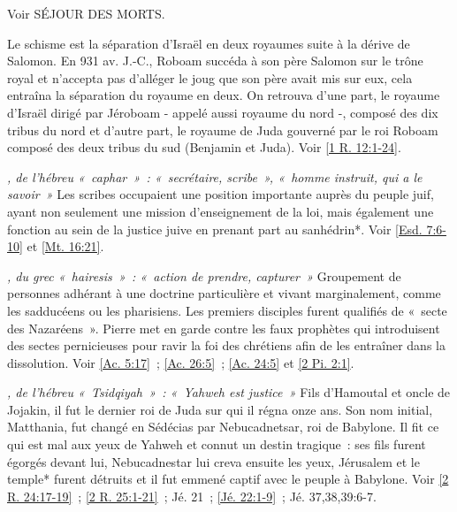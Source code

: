 \begin{multicols}{2}
\textit{}\newline
Voir SÉJOUR DES MORTS.

\textit{}\newline
Le schisme est la séparation d'Israël en deux royaumes suite à la dérive de Salomon. En 931 av. J.-C., Roboam succéda à son père Salomon sur le trône royal et n'accepta pas d'alléger le joug que son père avait mis sur eux, cela entraîna la séparation du royaume en deux. On retrouva d'une part, le royaume d'Israël dirigé par Jéroboam - appelé aussi royaume du nord -, composé des dix tribus du nord et d'autre part, le royaume de Juda gouverné par le roi Roboam composé des deux tribus du sud (Benjamin et Juda). Voir \vref{1 R. 12:1-24}.

\textit{, de l'hébreu «~caphar~»~: «~secrétaire, scribe~», «~homme instruit, qui a le savoir~»}\newline
Les scribes occupaient une position importante auprès du peuple juif, ayant non seulement une mission d'enseignement de la loi, mais également une fonction au sein de la justice juive en prenant part au sanhédrin*. Voir \vref{Esd. 7:6-10} et \vref{Mt. 16:21}.

\textit{, du grec «~hairesis~»~: «~action de prendre, capturer~»}\newline
Groupement de personnes adhérant à une doctrine particulière et vivant marginalement, comme les sadducéens ou les pharisiens. Les premiers disciples furent qualifiés de «~secte des Nazaréens~». Pierre met en garde contre les faux prophètes qui introduisent des sectes pernicieuses pour ravir la foi des chrétiens afin de les entraîner dans la dissolution. Voir \vref{Ac. 5:17}~; \vref{Ac. 26:5}~; \vref{Ac. 24:5} et \vref{2 Pi. 2:1}.

\textit{, de l'hébreu «~Tsidqiyah~»~: «~Yahweh est justice~»}\newline
Fils d'Hamoutal et oncle de Jojakin, il fut le dernier roi de Juda sur qui il régna onze ans. Son nom initial, Matthania, fut changé en Sédécias par Nebucadnetsar, roi de Babylone. Il fit ce qui est mal aux yeux de Yahweh et connut un destin tragique~: ses fils furent égorgés devant lui, Nebucadnestar lui creva ensuite les yeux, Jérusalem et le temple* furent détruits et il fut emmené captif avec le peuple à Babylone. Voir \vref{2 R. 24:17-19}~; \vref{2 R. 25:1-21}~; Jé. 21~; \vref{Jé. 22:1-9}~; Jé. 37,38,39:6-7.


\end{multicols}
